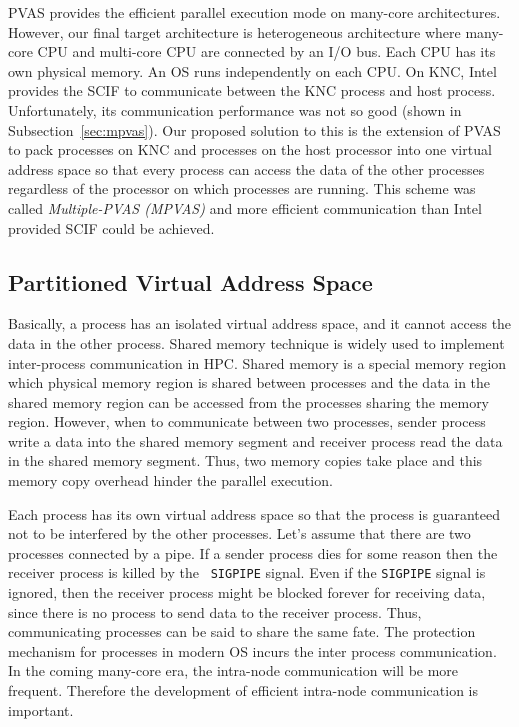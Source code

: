 PVAS provides the efficient parallel execution mode on many-core
architectures. However, our final target architecture is heterogeneous
architecture where many-core CPU and multi-core CPU are connected by
an I/O bus\cite{mikiko:2013,shimosawa2014}. Each CPU has its own
physical memory. An OS runs 
independently on each CPU. On KNC, Intel provides the SCIF to
communicate between the KNC process and host 
process. Unfortunately, its communication performance was not so
good (shown in Subsection~\ref{sec:mpvas}). Our proposed solution to
this is the extension of PVAS to pack processes on KNC and processes
on the host processor into one virtual address space so that every
process can access the data of the other processes regardless of the
processor on which processes are running. This scheme was called
{\em Multiple-PVAS (MPVAS)} and more efficient communication than Intel
provided SCIF could be achieved. 

\subsection{Partitioned Virtual Address Space}\label{sec:pvas}

Basically, a process has an isolated virtual address space, and it
cannot access the data in the other process. Shared memory technique
is widely used to implement inter-process communication in HPC. Shared
memory is a special memory region which physical memory region is
shared between processes and the data in the shared memory region can
be accessed from the processes sharing the memory region. However,
when to communicate between two processes, sender process write a data
into the shared memory segment and receiver process read the data in
the shared memory segment. Thus, two memory copies take place and this
memory copy overhead hinder the parallel execution.

Each process has its own virtual address space so that the process is
guaranteed not to be interfered by the other processes. Let's assume
that there are two processes connected by a pipe. If a sender process
dies for some reason then the receiver process is killed by the {\tt
SIGPIPE} signal.  Even if the {\tt SIGPIPE} signal is ignored, then the
receiver process might be blocked forever for receiving data, since
there is no process to send data to the receiver process. Thus,
communicating processes can be said to share the same fate. The
protection mechanism for processes in modern OS incurs the inter
process communication. In the coming many-core era, the intra-node
communication will be more frequent. Therefore the development of
efficient intra-node communication is important. 


